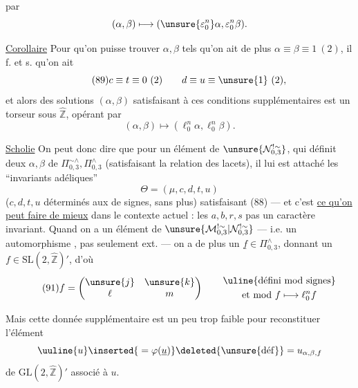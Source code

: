 

par
\[
 (\alpha,\beta)\longmapsto
 (\unsure{\varepsilon_0^n}\alpha,\varepsilon_0^n\beta).
\]

\uline{Corollaire} Pour qu'on puisse trouver $\alpha,\beta$ tels qu'on ait de plus $\alpha\equiv\beta\equiv1\ (2)$, il f. et s. qu'on ait
\[
\tag{89}
 c\equiv t\equiv0\ (2)\qquad d\equiv u\equiv\unsure{1}\ (2),
\]
et alors  des solutions $(\alpha,\beta)$ satisfaisant à ces conditions supplémentaires est un torseur sous $\widehat{\mathbb Z}$, opérant par
\[
 (\alpha,\beta)\longmapsto(\ell_0^n\alpha,\ell_0^n\beta).
\]

\uline{Scholie} On peut donc dire que pour un élément  de $\unsure{\mathcal N_{0,3}^{!\sim}}$, qui définit deux $\alpha,\beta$ de $\Pi_{0,3}^{\sim\wedge},\Pi_{0,3}^{\wedge}$  (satisfaisant la relation des lacets), il lui est attaché les ``invariants adéliques'' 
\[
\tag{90}
 \Theta=(\mu,c,d,t,u)
\]
($c,d,t,u$ déterminés aux  de signes, sans plus) satisfaisant (88) --- et c'est \uline{ce qu'on peut faire de mieux} dans le contexte actuel : les $a,b,r,s$  pas un caractère invariant. Quand on a un élément  de $\unsure{\mathcal M_{0,3}^{!\sim}|\mathcal N_{0,3}^{!\sim}}$ --- i.e. un automorphisme , pas seulement ext. --- on a de plus un $\underline f\in\Pi_{0,3}^{\wedge}$, donnant un $f\in\mathrm{SL}(2,\widehat{\mathbb Z})'$, d'où
\[
\tag{91}
 f=\begin{pmatrix}\unsure{j}&\unsure{k}\\ \ell&m\end{pmatrix}
 \qquad\begin{gathered}\uline{\text{défini mod signes}}\\
 \text{et mod } f\longmapsto\ell_0^n f
 \end{gathered}
\]



Mais cette donnée supplémentaire est un peu trop
faible pour reconstituer  l'élément
\[
 \uuline{u}\inserted{{}=\varphi(\underline u)}\deleted{\unsure{\mathrm{d\acute{e}f}}}
 =u_{\alpha,\beta,f}
\]
de $\mathrm{GL}(2,\widehat{\mathbb Z})'$ associé à $u$.

